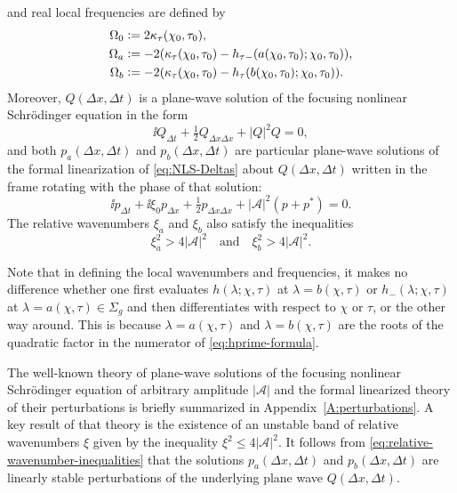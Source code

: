 \begin{corollary}
and real local frequencies are defined by
\begin{equation}
\begin{split}
\Omega_0&\vcentcolon= 2\kappa_\tau(\chi_0,\tau_0),\\
\Omega_a&\vcentcolon= -2(\kappa_\tau(\chi_0,\tau_0)-h_{\tau-}(a(\chi_0,\tau_0);\chi_0,\tau_0)),\\
\Omega_b&\vcentcolon= -2(\kappa_\tau(\chi_0,\tau_0)-h_{\tau}(b(\chi_0,\tau_0);\chi_0,\tau_0)).
\end{split}
\label{eq:frequencies-intro}
\end{equation}
Moreover, $Q(\Delta x,\Delta t)$ is a plane-wave solution of the focusing nonlinear Schr\"odinger equation in the form
\begin{equation}
\ii Q_{\Delta t} + \tfrac{1}{2} Q_{\Delta x\Delta x} + |Q|^2Q=0,
\label{eq:NLS-Deltas}
\end{equation}
and both $p_a(\Delta x,\Delta t)$ and $p_b(\Delta x,\Delta t)$ are particular plane-wave solutions of the formal linearization of \eqref{eq:NLS-Deltas} about $Q(\Delta x,\Delta t)$ written in the frame rotating with the phase of that solution:
\begin{equation}
\ii p_{\Delta t} + \ii\xi_0p_{\Delta x} + \tfrac{1}{2}p_{\Delta x\Delta x} +|\mathcal{A}|^2(p+p^*)=0.
\label{eq:linearization-intro}
\end{equation}
The relative wavenumbers $\xi_a$ and $\xi_b$ also satisfy the inequalities
\begin{equation}
\xi_a^2>4|\mathcal{A}|^2\quad\text{and}\quad \xi_b^2>4|\mathcal{A}|^2.
\label{eq:relative-wavenumber-inequalities}
\end{equation}
\label{cor:shelves-local}
\end{corollary}
Note that in defining the local wavenumbers and frequencies, it makes no difference whether one first evaluates $h(\lambda;\chi,\tau)$ at $\lambda=b(\chi,\tau)$ or $h_-(\lambda;\chi,\tau)$ at $\lambda=a(\chi,\tau)\in\Sigma_g$ and then differentiates with respect to $\chi$ or $\tau$, or the other way around.  This is because $\lambda=a(\chi,\tau)$ and $\lambda=b(\chi,\tau)$ are the roots of the quadratic factor in the  numerator of \eqref{eq:hprime-formula}.

The well-known theory of plane-wave solutions of the focusing nonlinear Schr\"odinger equation 
of arbitrary amplitude $|\mathcal{A}|$ and the formal linearized theory of their perturbations is briefly summarized in Appendix~\ref{A:perturbations}.  A key result of that theory is the existence of an unstable band of relative wavenumbers $\xi$ given by the inequality $\xi^2\le 4|\mathcal{A}|^2$.  It follows from \eqref{eq:relative-wavenumber-inequalities} that the solutions $p_a(\Delta x,\Delta t)$ and $p_b(\Delta x,\Delta t)$ are linearly stable perturbations of the underlying plane wave $Q(\Delta x,\Delta t)$.

